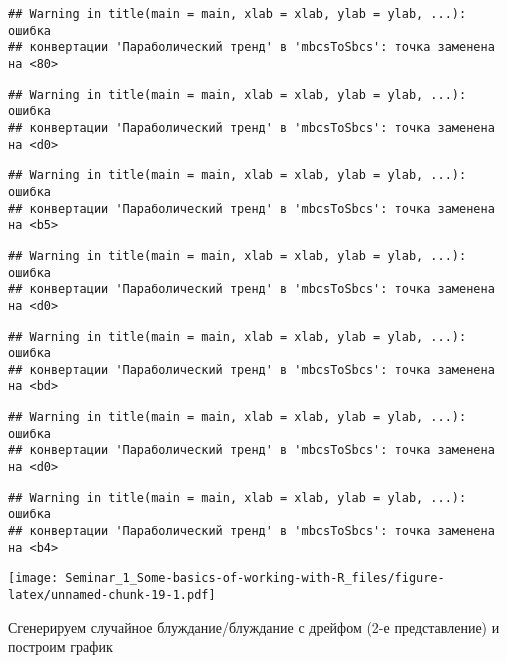 \documentclass[
]{article}
\begin{document}
\begin{verbatim}
## Warning in title(main = main, xlab = xlab, ylab = ylab, ...): ошибка
## конвертации 'Параболический тренд' в 'mbcsToSbcs': точка заменена на <80>
\end{verbatim}

\begin{verbatim}
## Warning in title(main = main, xlab = xlab, ylab = ylab, ...): ошибка
## конвертации 'Параболический тренд' в 'mbcsToSbcs': точка заменена на <d0>
\end{verbatim}

\begin{verbatim}
## Warning in title(main = main, xlab = xlab, ylab = ylab, ...): ошибка
## конвертации 'Параболический тренд' в 'mbcsToSbcs': точка заменена на <b5>
\end{verbatim}

\begin{verbatim}
## Warning in title(main = main, xlab = xlab, ylab = ylab, ...): ошибка
## конвертации 'Параболический тренд' в 'mbcsToSbcs': точка заменена на <d0>
\end{verbatim}

\begin{verbatim}
## Warning in title(main = main, xlab = xlab, ylab = ylab, ...): ошибка
## конвертации 'Параболический тренд' в 'mbcsToSbcs': точка заменена на <bd>
\end{verbatim}

\begin{verbatim}
## Warning in title(main = main, xlab = xlab, ylab = ylab, ...): ошибка
## конвертации 'Параболический тренд' в 'mbcsToSbcs': точка заменена на <d0>
\end{verbatim}

\begin{verbatim}
## Warning in title(main = main, xlab = xlab, ylab = ylab, ...): ошибка
## конвертации 'Параболический тренд' в 'mbcsToSbcs': точка заменена на <b4>
\end{verbatim}

\texttt{[image: Seminar\_1\_Some-basics-of-working-with-R\_files/figure-latex/unnamed-chunk-19-1.pdf]}

Сгенерируем случайное блуждание/блуждание с дрейфом (2-е представление)
и построим график
\end{document}
